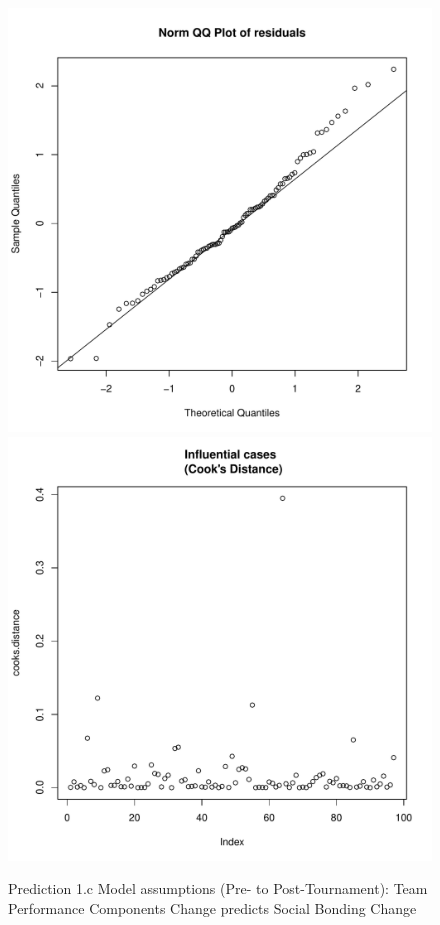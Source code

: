 \begin{CJK}{UTF8}{gbsn}
\begin{figure}[!htbp]
        \includegraphics[scale =.4]{images/MLM23aQQNorm.pdf}
        \includegraphics[scale =.4]{images/MLM23aCooksD.pdf}
        \caption{Prediction 1.c Model assumptions (Pre- to Post-Tournament): Team Performance Components Change predicts Social Bonding Change}
        \label{fig:MLM23aAssumptions}
      \end{figure}







\end{CJK}
